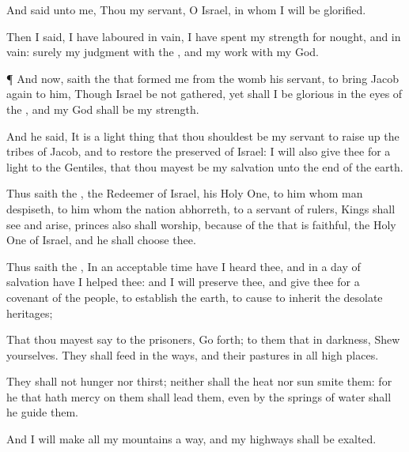 {And
said unto me, Thou
{} my
servant, O
Israel, in whom I will be
glorified.

Then I
said, I have
laboured in
vain, I have
spent my
strength for
nought, and in
vain:
{}
surely my
judgment
{} with the
{}, and my
work with my
God.


\par }{\PP {}¶ And now,
saith the
{} that
formed me from the
womb
{} his
servant, to
bring
Jacob
again to him, Though
Israel be not
gathered, yet shall I be
glorious in the
eyes of the
{}, and my
God shall be my
strength.

And he
said, It is a light
thing that thou shouldest be my
servant to raise
up the
tribes of
Jacob, and to
restore the
preserved of
Israel: I will also
give thee for a
light to the
Gentiles, that thou mayest be my
salvation unto the
end of the
earth.


\par }{\PP {}Thus
saith the
{}, the
Redeemer of
Israel,
{} his Holy
One, to him whom
man
despiseth, to him whom the
nation
abhorreth, to a
servant of
rulers,
Kings shall
see and
arise,
princes also shall
worship, because of the
{} that is
faithful,
{} the Holy
One of
Israel, and he shall
choose thee.

Thus
saith the
{}, In an
acceptable
time have I
heard thee, and in a
day of
salvation have I
helped thee: and I will
preserve thee, and
give thee for a
covenant of the
people, to
establish the
earth, to cause to
inherit the
desolate
heritages;

That thou mayest
say to the
prisoners, Go
forth; to them that
{} in
darkness,
Shew yourselves. They shall
feed in the
ways, and their
pastures
{} in all high
places.

They shall not
hunger nor
thirst; neither shall the
heat nor
sun
smite them: for he that hath
mercy on them shall
lead them, even by the
springs of
water shall he
guide them.

And I will
make all my
mountains a
way, and my
highways shall be
exalted.

}

